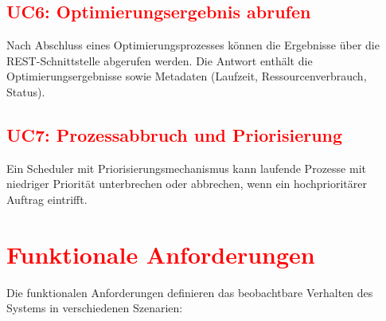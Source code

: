 \subsection{\textcolor{red}{UC6: Optimierungsergebnis abrufen}}
Nach Abschluss eines Optimierungsprozesses können die Ergebnisse über die REST-Schnittstelle abgerufen werden. Die Antwort enthält die Optimierungsergebnisse sowie Metadaten (Laufzeit, Ressourcenverbrauch, Status).

\subsection{\textcolor{red}{UC7: Prozessabbruch und Priorisierung}}
Ein Scheduler mit Priorisierungsmechanismus kann laufende Prozesse mit niedriger Priorität unterbrechen oder abbrechen, wenn ein hochprioritärer Auftrag eintrifft.

\section{\textcolor{red}{Funktionale Anforderungen}}

Die funktionalen Anforderungen definieren das beobachtbare Verhalten des Systems in verschiedenen Szenarien:

